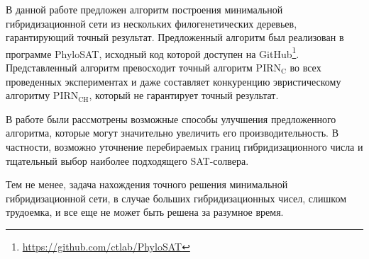\FloatBarrier
\startconclusionpage

В данной работе предложен алгоритм построения минимальной гибридизационной сети из нескольких филогенетических деревьев, гарантирующий точный результат.
Предложенный алгоритм был реализован в программе PhyloSAT, исходный код которой доступен на GitHub\footnote{\url{https://github.com/ctlab/PhyloSAT}}.
Представленный алгоритм превосходит точный алгоритм $\mathrm{PIRN_C}$ во всех проведенных экспериментах и даже составляет конкуренцию эвристическому алгоритму $\mathrm{PIRN_{CH}}$, который не гарантирует точный результат.

В работе были рассмотрены возможные способы улучшения предложенного алгоритма, которые могут значительно увеличить его производительность. В частности, возможно уточнение перебираемых границ гибридизационного числа и тщательный выбор наиболее подходящего SAT-солвера.

Тем не менее, задача нахождения точного решения минимальной гибридизационной сети, в случае больших гибридизационных чисел, слишком трудоемка, и все еще не может быть решена за разумное время.